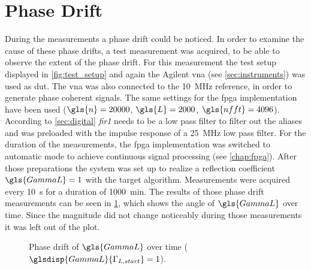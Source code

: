 \documentclass[12pt,a4paper,parskip=full,abstract=true,BCOR=12mm,twoside,open=right]{scrreprt}
\def\device#1{\textit{#1}}
\begin{document}

\section{Phase Drift}
\label{sec:drift}

During the measurements a phase drift could be noticed. In order to examine the
cause of these phase drifts, a test measurement was acquired, to be able
to observe the extent of the phase drift. For this measurement the test setup
displayed in \cref{fig:test_setup} and again the Agilent \gls{vna} (see \cref{sec:instruments})
was used as \gls{dut}. The \gls{vna} was also connected to the
\SI{10}{\mega\hertz} reference, in order to generate phase coherent signals. The same
settings for the \gls{fpga} implementation have been used ($\gls{n} = 20000$, $\gls{L} = 2000$, $\gls{nfft} = 4096$).
According to \cref{sec:digital} \device{fir1} needs to be a low pass filter to
filter out the aliases and was preloaded with the impulse response of a \SI{25}{\mega\hertz} low pass filter.
For the duration of the measurements, the \gls{fpga} implementation was switched to automatic mode to
achieve continuous signal processing (see \cref{chap:fpga}). After
those preparations the system was set up to realize a reflection coefficient $\gls{GammaL} = 1$ with
the target algorithm. Measurements were acquired every \SI{10}{\second} for a duration
of \SI{1000}{\minute}. The results of those phase drift measurements can be seen in
\cref{fig:phase_single}, which shows the angle of $\gls{GammaL}$ over time. Since the magnitude did not change noticeably during those measurements
it was left out of the plot.

\begin{figure}[htb]
    \centering
    \caption{Phase drift of $\gls{GammaL}$ over time ($\glsdisp{GammaL}{\Gamma_{L,start}} = 1$).}
    \label{fig:phase_single}
\end{figure}
\end{document}
